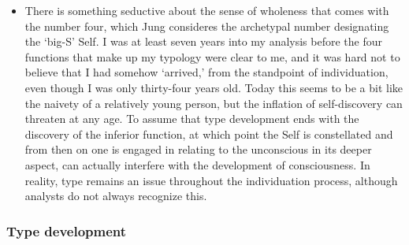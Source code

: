 \begin{itemize}
\item There is something seductive about the sense of wholeness that comes with
the number four, which Jung consideres the archetypal number designating the
`big-S' Self. I was at least seven years into my analysis before the four
functions that make up my typology were clear to me, and it was hard not to
believe that I had somehow `arrived,' from the standpoint of individuation,
even though I was only thirty-four years old. Today this seems to be a bit like
the naivety of a relatively young person, but the inflation of self-discovery
can threaten at any age. To assume that type development ends with the
discovery of the inferior function, at which point the Self is constellated and
from then on one is engaged in relating to the unconscious in its deeper
aspect, can actually interfere with the development of consciousness.  In
reality, type remains an issue throughout the individuation process, although
analysts do not always recognize this.

\end{itemize}

\subsubsection{Type development}

